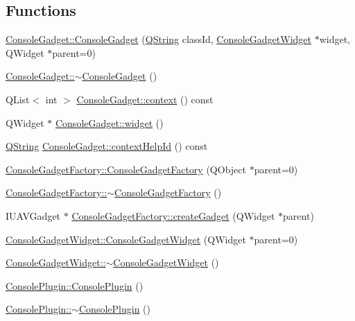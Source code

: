 \subsection*{\-Functions}
\begin{DoxyCompactItemize}
\item 
\hyperlink{group___console_plugin_ga4c0ebb0d0d98dc2464d1a43c68feec60}{\-Console\-Gadget\-::\-Console\-Gadget} (\hyperlink{group___u_a_v_objects_plugin_gab9d252f49c333c94a72f97ce3105a32d}{\-Q\-String} class\-Id, \hyperlink{class_console_gadget_widget}{\-Console\-Gadget\-Widget} $\ast$widget, \-Q\-Widget $\ast$parent=0)
\item 
\hyperlink{group___console_plugin_ga8cfb9cc05b03bf8d1ff2fda3befc6326}{\-Console\-Gadget\-::$\sim$\-Console\-Gadget} ()
\item 
\-Q\-List$<$ int $>$ \hyperlink{group___console_plugin_ga0035ad50dabedbce0cb07ecd85ef95f0}{\-Console\-Gadget\-::context} () const 
\item 
\-Q\-Widget $\ast$ \hyperlink{group___console_plugin_gaa9fff820073d054b2ab58500206fe54d}{\-Console\-Gadget\-::widget} ()
\item 
\hyperlink{group___u_a_v_objects_plugin_gab9d252f49c333c94a72f97ce3105a32d}{\-Q\-String} \hyperlink{group___console_plugin_gad1700fcf695662402ed7faba6ca2a239}{\-Console\-Gadget\-::context\-Help\-Id} () const 
\item 
\hyperlink{group___console_plugin_ga77777adade86473e7c810b2e0a64e5b0}{\-Console\-Gadget\-Factory\-::\-Console\-Gadget\-Factory} (\-Q\-Object $\ast$parent=0)
\item 
\hyperlink{group___console_plugin_ga906d7deb3783cbcb35b88c42eb8be4d8}{\-Console\-Gadget\-Factory\-::$\sim$\-Console\-Gadget\-Factory} ()
\item 
\-I\-U\-A\-V\-Gadget $\ast$ \hyperlink{group___console_plugin_gac39d102639ab8db1917e47e48338487b}{\-Console\-Gadget\-Factory\-::create\-Gadget} (\-Q\-Widget $\ast$parent)
\item 
\hyperlink{group___console_plugin_gaf36f2dbb51922f2b8cea7297df751bde}{\-Console\-Gadget\-Widget\-::\-Console\-Gadget\-Widget} (\-Q\-Widget $\ast$parent=0)
\item 
\hyperlink{group___console_plugin_ga8f28b960cce5aee7f66b35e0fb38fd12}{\-Console\-Gadget\-Widget\-::$\sim$\-Console\-Gadget\-Widget} ()
\item 
\hyperlink{group___console_plugin_ga1200bf1b46402c602901b2444d697eb9}{\-Console\-Plugin\-::\-Console\-Plugin} ()
\item 
\hyperlink{group___console_plugin_ga052ccde553f4cd9ef381d5035141b863}{\-Console\-Plugin\-::$\sim$\-Console\-Plugin} ()

\end{DoxyCompactItemize}
